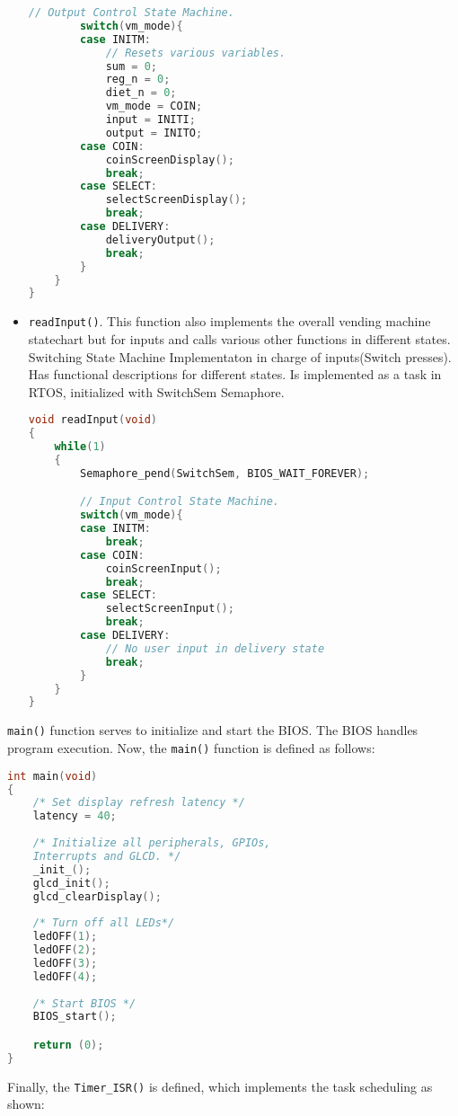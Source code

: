 \documentclass{article}
\begin{document}
\begin{itemize}
\begin{lstlisting}[basicstyle = \small, language = C]
        // Output Control State Machine.
        switch(vm_mode){
        case INITM:
            // Resets various variables.
            sum = 0;
            reg_n = 0;
            diet_n = 0;
            vm_mode = COIN;
            input = INITI;
            output = INITO;
        case COIN:
            coinScreenDisplay();
            break;
        case SELECT:
            selectScreenDisplay();
            break;
        case DELIVERY:
            deliveryOutput();
            break;
        }
    }
}
  \end{lstlisting}
  \item \texttt{readInput()}. This function also implements the overall vending machine statechart but for inputs and calls various other functions in different states. Switching State Machine Implementaton in charge of inputs(Switch presses). Has functional descriptions for different states. Is implemented as a task in RTOS, initialized with SwitchSem Semaphore.
      \begin{lstlisting}[basicstyle = \small, language = C]
void readInput(void)
{
    while(1)
    {
        Semaphore_pend(SwitchSem, BIOS_WAIT_FOREVER);

        // Input Control State Machine.
        switch(vm_mode){
        case INITM:
            break;
        case COIN:
            coinScreenInput();
            break;
        case SELECT:
            selectScreenInput();
            break;
        case DELIVERY:
            // No user input in delivery state
            break;
        }
    }
}
  \end{lstlisting}
\end{itemize}
\qquad \texttt{main()} function serves to initialize and start the BIOS. The BIOS handles program execution. Now, the \texttt{main()} function is defined as follows:
      \begin{lstlisting}[basicstyle = \small, language = C]
int main(void)
{
    /* Set display refresh latency */
    latency = 40;
    
    /* Initialize all peripherals, GPIOs, 
    Interrupts and GLCD. */
    _init_();
    glcd_init();
    glcd_clearDisplay();
    
    /* Turn off all LEDs*/
    ledOFF(1);
    ledOFF(2);
    ledOFF(3);
    ledOFF(4);
    
    /* Start BIOS */
    BIOS_start();

    return (0);
}
  \end{lstlisting}
\qquad Finally, the \texttt{Timer\_ISR()} is defined, which implements the task scheduling as shown: \\ \\
\end{document}
